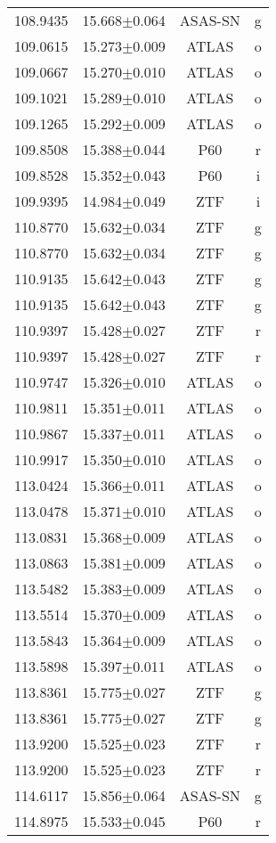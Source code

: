 \begin{table}
\begin{tabular}{cccc}
108.9435 & 15.668$\pm$0.064 & ASAS-SN & g \\
109.0615 & 15.273$\pm$0.009 & ATLAS & o \\
109.0667 & 15.270$\pm$0.010 & ATLAS & o \\
109.1021 & 15.289$\pm$0.010 & ATLAS & o \\
109.1265 & 15.292$\pm$0.009 & ATLAS & o \\
109.8508 & 15.388$\pm$0.044 & P60 & r \\
109.8528 & 15.352$\pm$0.043 & P60 & i \\
109.9395 & 14.984$\pm$0.049 & ZTF & i \\
110.8770 & 15.632$\pm$0.034 & ZTF & g \\
110.8770 & 15.632$\pm$0.034 & ZTF & g \\
110.9135 & 15.642$\pm$0.043 & ZTF & g \\
110.9135 & 15.642$\pm$0.043 & ZTF & g \\
110.9397 & 15.428$\pm$0.027 & ZTF & r \\
110.9397 & 15.428$\pm$0.027 & ZTF & r \\
110.9747 & 15.326$\pm$0.010 & ATLAS & o \\
110.9811 & 15.351$\pm$0.011 & ATLAS & o \\
110.9867 & 15.337$\pm$0.011 & ATLAS & o \\
110.9917 & 15.350$\pm$0.010 & ATLAS & o \\
113.0424 & 15.366$\pm$0.011 & ATLAS & o \\
113.0478 & 15.371$\pm$0.010 & ATLAS & o \\
113.0831 & 15.368$\pm$0.009 & ATLAS & o \\
113.0863 & 15.381$\pm$0.009 & ATLAS & o \\
113.5482 & 15.383$\pm$0.009 & ATLAS & o \\
113.5514 & 15.370$\pm$0.009 & ATLAS & o \\
113.5843 & 15.364$\pm$0.009 & ATLAS & o \\
113.5898 & 15.397$\pm$0.011 & ATLAS & o \\
113.8361 & 15.775$\pm$0.027 & ZTF & g \\
113.8361 & 15.775$\pm$0.027 & ZTF & g \\
113.9200 & 15.525$\pm$0.023 & ZTF & r \\
113.9200 & 15.525$\pm$0.023 & ZTF & r \\
114.6117 & 15.856$\pm$0.064 & ASAS-SN & g \\
114.8975 & 15.533$\pm$0.045 & P60 & r \\

\end{tabular}
\end{table}
